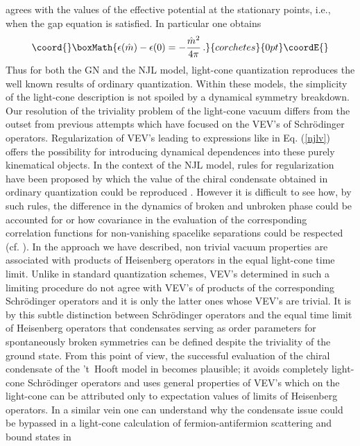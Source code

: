 \documentclass[a4paper,12pt]{article}
\begin{document}
agrees with the values of the effective potential at the stationary points, i.e., when the gap
equation is satisfied. In particular one obtains
\begin{displaymath}\coord{}\boxMath{
\epsilon(\hat{m})- \epsilon(0) = -\frac{\hat{m}^{2}}{4\pi}\, .
}{corchetes}{0pt}\coordE{}\end{displaymath}
Thus for both the GN and the NJL model, light-cone quantization reproduces the well known
results of ordinary quantization. Within these models, the simplicity of the light-cone description
is not spoiled by a dynamical symmetry breakdown.  \\
Our resolution of the triviality problem of the light-cone vacuum differs from the outset from
previous attempts  which have focused on the VEV's of Schr\"odinger operators. Regularization
of VEV's leading to expressions
like in Eq. (\ref{njlv}) offers the possibility for introducing dynamical dependences
into these purely kinematical objects. In the context of the NJL model, rules for regularization
have been proposed by which the value of the chiral condensate obtained in ordinary quantization
could be reproduced \cite{Dietmaier89,Bentz99, Itakura00}. However it is difficult to see how,
by such rules, the difference in the dynamics of broken and unbroken phase could be accounted
for or how covariance in the evaluation of the corresponding correlation functions for non-vanishing
spacelike separations could be respected (cf. \cite{ Tsujimaru98}). In the approach we have
described, non trivial vacuum properties are associated with products of Heisenberg operators
in the equal light-cone time limit. Unlike in standard quantization schemes, VEV's determined
in such a limiting procedure do not agree with VEV's of products of the corresponding
Schr\"odinger operators and it is only the latter ones whose VEV's are trivial. It is by this
subtle distinction between Schr\"odinger operators and the equal time limit of Heisenberg
operators that condensates serving as order parameters for spontaneously broken symmetries
can be defined despite the triviality of the ground state. From this point of view, the successful
evaluation of the chiral condensate of the 't~Hooft model in \cite{Zhitnitsky} becomes plausible;
it avoids completely light-cone Schr\"odinger operators and uses general properties of VEV's
which on the light-cone can be attributed only to expectation values of limits of Heisenberg operators.
In a similar vein one can understand why the condensate issue could be bypassed in a
light-cone calculation of fermion-antifermion scattering and bound states in
\end{document}
